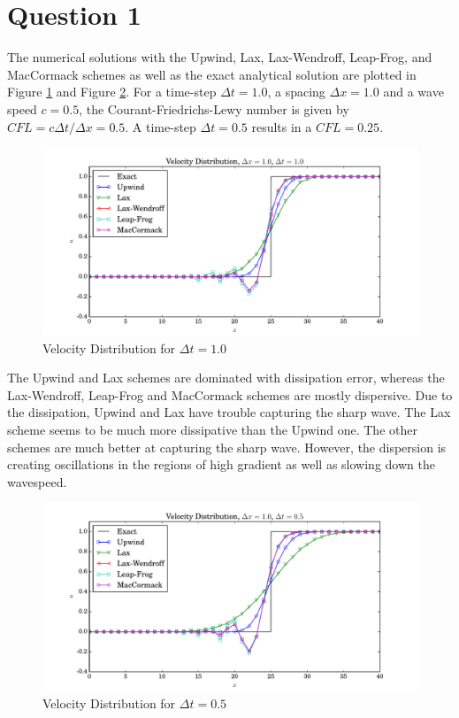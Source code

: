 \documentclass[letterpaper,12pt,]{article}
\begin{document}


\section*{Question 1}

The numerical solutions with the Upwind, Lax, Lax-Wendroff, Leap-Frog, and MacCormack schemes as well as the exact analytical solution are plotted in Figure \ref{fig:q11} and Figure \ref{fig:q12}.
For a time-step $\Delta t = 1.0$, a spacing $\Delta x = 1.0$ and a wave speed $c=0.5$, the Courant-Friedrichs-Lewy number is given by $CFL = c \Delta t / \Delta x = 0.5$.
A time-step $\Delta t = 0.5$ results in a $CFL = 0.25$.

\begin{figure}[h]
    \centering
    \includegraphics[width = \textwidth]{./Figures/q1_1}
    \caption{Velocity Distribution for $\Delta t = 1.0$}
    \label{fig:q11}
\end{figure}

The Upwind and Lax schemes are dominated with dissipation error, whereas the Lax-Wendroff, Leap-Frog and MacCormack schemes are mostly dispersive.
Due to the dissipation, Upwind and Lax have trouble capturing the sharp wave. The Lax scheme seems to be much more dissipative than the Upwind one.
The other schemes are much better at capturing the sharp wave.
However, the dispersion is creating oscillations in the regions of high gradient as well as slowing down the wavespeed.

\begin{figure}[h]
    \centering
    \includegraphics[width = \textwidth]{./Figures/q1_2}
    \caption{Velocity Distribution for $\Delta t = 0.5$}
    \label{fig:q12}
\end{figure}
\end{document}
